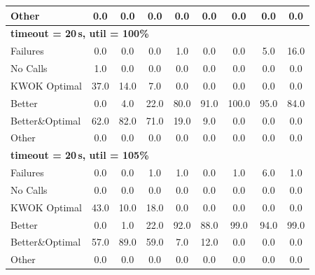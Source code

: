 \begin{tabular}{l cccccccc}
Other & 0.0 & 0.0 & 0.0 & 0.0 & 0.0 & 0.0 & 0.0 & 0.0 \\
\midrule
\multicolumn{9}{l}{\textbf{timeout = 20\,s, util = 100\%}} \\
\midrule
Failures & 0.0 & 0.0 & 0.0 & 1.0 & 0.0 & 0.0 & 5.0 & 16.0 \\
No Calls & 1.0 & 0.0 & 0.0 & 0.0 & 0.0 & 0.0 & 0.0 & 0.0 \\
KWOK Optimal & 37.0 & 14.0 & 7.0 & 0.0 & 0.0 & 0.0 & 0.0 & 0.0 \\
Better & 0.0 & 4.0 & 22.0 & 80.0 & 91.0 & 100.0 & 95.0 & 84.0 \\
Better\&Optimal & 62.0 & 82.0 & 71.0 & 19.0 & 9.0 & 0.0 & 0.0 & 0.0 \\
Other & 0.0 & 0.0 & 0.0 & 0.0 & 0.0 & 0.0 & 0.0 & 0.0 \\
\midrule
\multicolumn{9}{l}{\textbf{timeout = 20\,s, util = 105\%}} \\
\midrule
Failures & 0.0 & 0.0 & 1.0 & 1.0 & 0.0 & 1.0 & 6.0 & 1.0 \\
No Calls & 0.0 & 0.0 & 0.0 & 0.0 & 0.0 & 0.0 & 0.0 & 0.0 \\
KWOK Optimal & 43.0 & 10.0 & 18.0 & 0.0 & 0.0 & 0.0 & 0.0 & 0.0 \\
Better & 0.0 & 1.0 & 22.0 & 92.0 & 88.0 & 99.0 & 94.0 & 99.0 \\
Better\&Optimal & 57.0 & 89.0 & 59.0 & 7.0 & 12.0 & 0.0 & 0.0 & 0.0 \\
Other & 0.0 & 0.0 & 0.0 & 0.0 & 0.0 & 0.0 & 0.0 & 0.0 \\
\bottomrule
\end{tabular}
